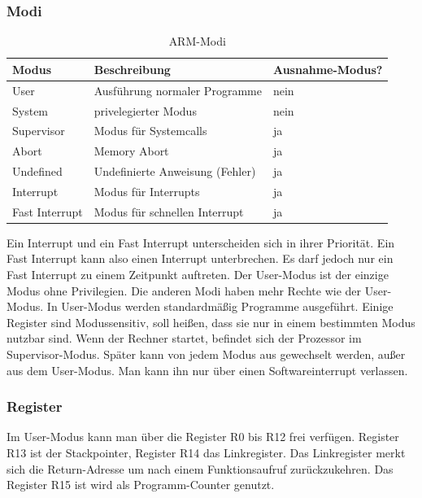 \subsubsection{Modi}
\begin{table}
    \begin{tabular}{lll}
    Modus          & Beschreibung                    & Ausnahme-Modus? \\ \hline
    User           & Ausführung normaler Programme   & nein            \\
    System         & privelegierter Modus            & nein            \\
    Supervisor     & Modus für Systemcalls           & ja              \\
    Abort          & Memory Abort                    & ja              \\
    Undefined      & Undefinierte Anweisung (Fehler) & ja              \\
    Interrupt      & Modus für Interrupts            & ja              \\
    Fast Interrupt & Modus für schnellen Interrupt   & ja              \\
    \end{tabular}
    \caption {ARM-Modi}
\end{table}
Ein Interrupt und ein Fast Interrupt unterscheiden sich in ihrer Priorität. Ein Fast Interrupt kann also einen Interrupt unterbrechen. Es darf jedoch nur ein Fast Interrupt zu einem Zeitpunkt auftreten. Der User-Modus ist der einzige Modus ohne Privilegien. Die anderen Modi haben mehr Rechte wie der User-Modus. In User-Modus werden standardmäßig Programme ausgeführt. Einige Register sind Modussensitiv, soll heißen, dass sie nur in einem bestimmten Modus nutzbar sind. Wenn der Rechner startet, befindet sich der Prozessor im Supervisor-Modus. Später kann von jedem Modus aus gewechselt werden, außer aus dem User-Modus. Man kann ihn nur über einen Softwareinterrupt verlassen. 
\subsubsection{Register}
Im User-Modus kann man über die Register R0 bis R12 frei verfügen. Register R13 ist der Stackpointer, Register R14 das Linkregister. Das Linkregister merkt sich die Return-Adresse um nach einem Funktionsaufruf zurückzukehren. Das Register R15 ist wird als Programm-Counter genutzt.

